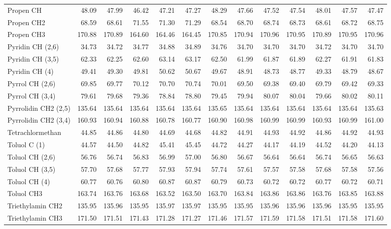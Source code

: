 \begin{table}[ht!]
{\begin{tabular}{lrrrrrrrrrrrr}
    Propen CH & 48.09 & 47.99 & 46.42 & 47.21 & 47.27 & 48.29 & 47.66 & 47.52 & 47.54 & 48.01 & 47.57 & 47.47 \\
    Propen CH2 & 68.59 & 68.61 & 71.55 & 71.30 & 71.29 & 68.54 & 68.70 & 68.74 & 68.73 & 68.61 & 68.72 & 68.75 \\
    Propen CH3 & 170.88 & 170.89 & 164.60 & 164.46 & 164.45 & 170.85 & 170.94 & 170.96 & 170.95 & 170.89 & 170.95 & 170.96 \\
    Pyridin CH (2,6) & 34.73 & 34.72 & 34.77 & 34.88 & 34.89 & 34.76 & 34.70 & 34.70 & 34.70 & 34.72 & 34.70 & 34.70 \\
    Pyridin CH (3,5) & 62.33 & 62.25 & 62.60 & 63.14 & 63.17 & 62.50 & 61.99 & 61.87 & 61.89 & 62.27 & 61.91 & 61.83 \\
    Pyridin CH (4) & 49.41 & 49.30 & 49.81 & 50.62 & 50.67 & 49.67 & 48.91 & 48.73 & 48.77 & 49.33 & 48.79 & 48.67 \\
    Pyrrol CH (2,6) & 69.85 & 69.77 & 70.12 & 70.70 & 70.74 & 70.01 & 69.50 & 69.38 & 69.40 & 69.79 & 69.42 & 69.33 \\
    Pyrrol CH (3,4) & 79.61 & 79.68 & 79.36 & 78.84 & 78.80 & 79.45 & 79.94 & 80.07 & 80.04 & 79.66 & 80.02 & 80.11 \\
    Pyrrolidin CH2 (2,5) & 135.64 & 135.64 & 135.64 & 135.64 & 135.64 & 135.65 & 135.64 & 135.64 & 135.64 & 135.64 & 135.64 & 135.63 \\
    Pyrrolidin CH2 (3,4) & 160.93 & 160.94 & 160.88 & 160.78 & 160.77 & 160.90 & 160.98 & 160.99 & 160.99 & 160.93 & 160.99 & 161.00 \\
    Tetrachlormethan & 44.85 & 44.86 & 44.80 & 44.69 & 44.68 & 44.82 & 44.91 & 44.93 & 44.92 & 44.86 & 44.92 & 44.93 \\
    Toluol C (1) & 44.57 & 44.50 & 44.82 & 45.41 & 45.45 & 44.72 & 44.27 & 44.17 & 44.19 & 44.52 & 44.20 & 44.13 \\
    Toluol CH (2,6) & 56.76 & 56.74 & 56.83 & 56.99 & 57.00 & 56.80 & 56.67 & 56.64 & 56.64 & 56.74 & 56.65 & 56.63 \\
    Toluol CH (3,5) & 57.70 & 57.68 & 57.77 & 57.93 & 57.94 & 57.74 & 57.61 & 57.57 & 57.58 & 57.68 & 57.58 & 57.56 \\
    Toluol CH (4) & 60.77 & 60.76 & 60.80 & 60.87 & 60.87 & 60.79 & 60.73 & 60.72 & 60.72 & 60.77 & 60.72 & 60.71 \\
    Toluol CH3 & 163.74 & 163.76 & 163.68 & 163.52 & 163.50 & 163.70 & 163.84 & 163.86 & 163.86 & 163.76 & 163.85 & 163.88 \\
    Triethylamin CH2 & 135.95 & 135.96 & 135.95 & 135.97 & 135.97 & 135.95 & 135.95 & 135.96 & 135.96 & 135.96 & 135.95 & 135.95 \\
    Triethylamin CH3 & 171.50 & 171.51 & 171.43 & 171.28 & 171.27 & 171.46 & 171.57 & 171.59 & 171.58 & 171.51 & 171.58 & 171.60 \\
    \end{tabular}}%
  \label{tab:sigmacosmo}%
\end{table}%

